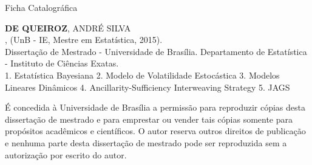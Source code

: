 \newpage
\begin{center}
\normalfont \onehalfspacing
Ficha Catalográfica

\vspace{4cm}
\raggedright
\begin{framed}
{\bf DE QUEIROZ}, ANDRÉ SILVA
\\
\titulo, (UnB - IE, Mestre em Estatística, 2015).
\\\vspace{1cm}
Dissertação de Mestrado - Universidade de Brasília. Departamento de Estatística - Instituto de Ciências Exatas.
\\\vspace{1cm}
1. Estatística Bayesiana 2. Modelo de Volatilidade Estocástica 3. Modelos Lineares Dinâmicos 4. Ancillarity-Sufficiency Interweaving Strategy 5. JAGS
\end{framed}

\justify
\vspace{3cm}
\noindent É concedida à Universidade de Brasília a permissão para reproduzir cópias desta dissertação de mestrado e para emprestar ou vender tais cópias somente para propósitos acadêmicos e científicos. O autor reserva outros direitos de publicação e nenhuma parte desta dissertação de mestrado pode ser reproduzida sem a autorização por escrito do autor.
\\

\raggedleft
\autor
\end{center}
